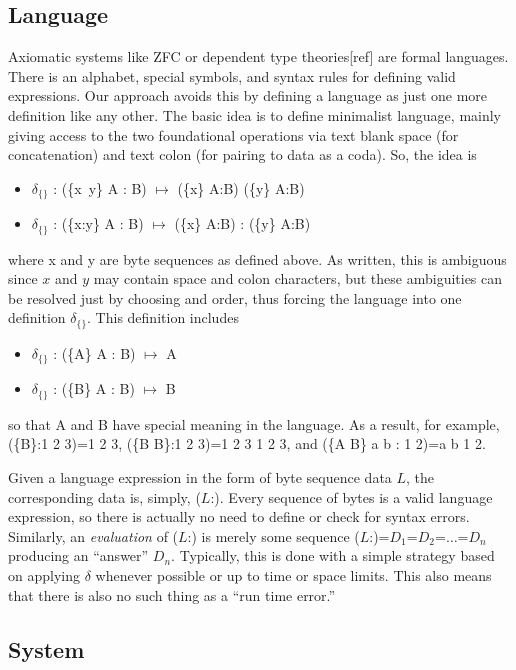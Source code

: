 \documentclass[11pt]{article}
\begin{document}
\subsection{Language} 

Axiomatic systems like ZFC\cite{ZFC} or dependent type theories[ref] are formal languages.  There is an alphabet, special symbols, and syntax rules 
for defining valid expressions.  Our approach avoids this by defining a language as just one more definition like any other.  The basic idea is to 
define minimalist language, mainly giving access to the two foundational operations via text blank space (for concatenation) and text colon (for pairing to data as a coda).  So, the idea is 
\begin{itemize}
\item {$\delta_{\{\}}$ : (\{x\ y\} A : B) $\mapsto$ (\{x\} A:B) (\{y\} A:B)}
\item {$\delta_{\{\}}$ : (\{x:y\} A : B) $\mapsto$ (\{x\} A:B) : (\{y\} A:B)}
\end{itemize}
where x and y are byte sequences as defined above.  As written, this is ambiguous since $x$ and $y$ may contain space and colon characters, but 
these ambiguities can be resolved just by choosing and order, thus forcing the language into one definition 
$\delta_{\{\}}$.  This definition includes 
\begin{itemize}
\item {$\delta_{\{\}}$ : (\{A\} A : B) $\mapsto$ A}
\item {$\delta_{\{\}}$ : (\{B\} A : B) $\mapsto$ B}
\end{itemize}
so that A and B have special meaning in the language.  As a result, for example, (\{B\}:1 2 3)=1 2 3, (\{B B\}:1 2 3)=1 2 3 1 2 3, and (\{A B\} a b : 1 2)=a b 1 2.  

     Given a language expression in the form of byte sequence data $L$, the corresponding data is, simply, ($L$:).  Every sequence of bytes is a valid language 
expression, so there is actually no need to define or check for syntax errors.  Similarly, an {\it evaluation} of ($L$:) is merely some sequence 
($L$:)=$D_1$=$D_2$=$\dots$=$D_n$ producing an ``answer'' $D_n$.  Typically, this is done with a simple strategy based on applying $\delta$ whenever 
possible or up to time or space limits.  This also means that there is also no such thing as a ``run time error.''    

\subsection{System} 
\end{document}
